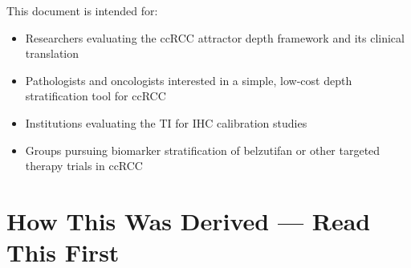 \documentclass[11pt, a4paper]{article}
\begin{document}
This document is intended for:

\begin{itemize}
    \item Researchers evaluating the ccRCC
    attractor depth framework and its
    clinical translation
    \item Pathologists and oncologists
    interested in a simple, low-cost
    depth stratification tool for ccRCC
    \item Institutions evaluating the TI
    for IHC calibration studies
    \item Groups pursuing biomarker
    stratification of belzutifan or other
    targeted therapy trials in ccRCC
\end{itemize}

\section{How This Was Derived ---
Read This First}
\label{sec:derivation}
\end{document}
